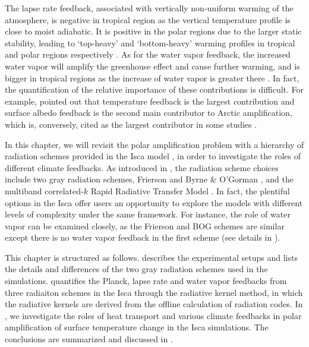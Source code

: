 The lapse rate feedback, associated with vertically non-uniform warming of the atmosphere, is negative in tropical region as the vertical temperature profile is close to moist adiabatic. It is positive in the polar regions due to the larger static stability, leading to `top-heavy' and `bottom-heavy' warming profiles in tropical and polar regions respectively \citep{Graversen2009, Pithan2014, Manabe1975, Kim2018}. As for the water vapor feedback, the increased water vapor will amplify the greenhouse effect and cause further warming, and is bigger in tropical regions as the increase of water vapor is greater there \citep{Taylor2013, Pithan2014}. In fact, the quantification of the relative importance of these contributions is difficult. For example, \cite{Pithan2014} pointed out that temperature feedback is the largest contribution and surface albedo feedback is the second main contributor to Arctic amplification, which is, conversely, cited as the largest contributor in some studies \citep[e.g.,][]{Manabe1975,Winton2006amplified,Hall2004}.


In this chapter, we will revisit the polar amplification problem with a hierarchy of radiation schemes provided in the Isca model \citep{Vallis2018}, in order to investigate the roles of different climate feedbacks. As introduced in , the radiation scheme choices include two gray radiation schemes, Frierson \citep{Frierson2006} and Byrne \& O'Gorman \citep[BOG hereafter;][]{Byrne2013}, and the multiband correlated-$k$ Rapid Radiative Transfer Model \citep[RRTM;][]{Clough2005}. In fact, the plentiful options in the Isca offer users an opportunity to explore the models with different levels of complexity under the same framework. For instance, the role of water vapor can be examined closely, as the Frierson and BOG schemes are similar except there is no water vapor feedback in the first scheme (see details in ).

This chapter is structured as follows.  describes the experimental setups and lists the details and differences of the two gray radiation schemes used in the simulations.  quantifies the Planck, lapse rate and water vapor feedbacks from three radiaiton schemes in the Isca through the radiative kernel method, in which the radiative kernels are derived from the offline calculation of radiation codes. In , we investigate the roles of heat transport and various climate feedbacks in polar amplification of surface temperature change in the Isca simulations. The conclusions are summarized and discussed in .

